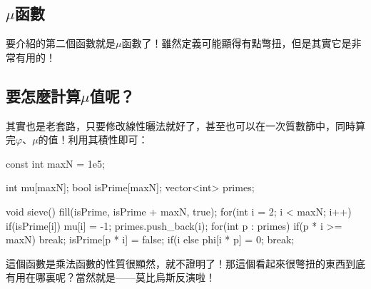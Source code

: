 \documentclass[main.tex]{subfiles}
\begin{document}
	\subsection{$\mu$函數}
		要介紹的第二個函數就是$\mu$函數了！雖然定義可能顯得有點彆扭，但是其實它是非常有用的！
	\subsection{要怎麼計算$\mu$值呢？}
		其實也是老套路，只要修改線性曬法就好了，甚至也可以在一次質數篩中，同時算完$\varphi$、$\mu$的值！利用其積性即可：
		\begin{C++}
const int maxN = 1e5;

int mu[maxN];
bool isPrime[maxN];
vector<int> primes;

void sieve(){
	fill(isPrime, isPrime + maxN, true);
	for(int i = 2; i < maxN; i++){
		if(isPrime[i]){
			mu[i] = -1;
			primes.push_back(i);
		}
		for(int p : primes){
			if(p * i >= maxN) break;
			isPrime[p * i] = false;
			if(i %
			else {
				phi[i * p] = 0;
				break;
			}
		}
	}
}
		\end{C++}
		這個函數是乘法函數的性質很顯然，就不證明了！那這個看起來很彆扭的東西到底有用在哪裏呢？當然就是——莫比烏斯反演啦！
\end{document}
